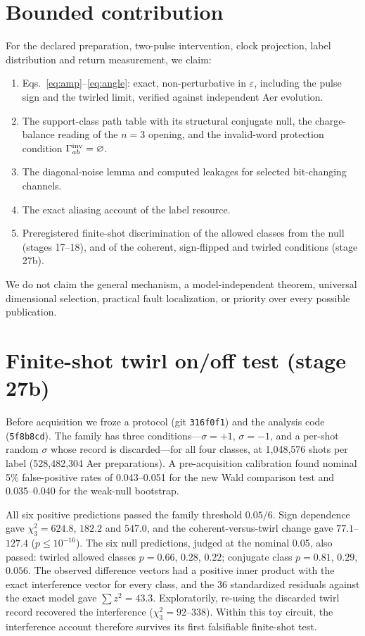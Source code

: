 \documentclass[11pt,a4paper]{article}
\begin{document}
\section*{Bounded contribution}
For the declared preparation, two-pulse intervention, clock projection, label distribution and return measurement, we claim:
\begin{enumerate}\itemsep0pt
\item Eqs.~\eqref{eq:amp}--\eqref{eq:angle}: exact, non-perturbative in $\varepsilon$, including the pulse sign and the twirled limit, verified against independent Aer evolution.
\item The support-class path table with its structural conjugate null, the charge-balance reading of the $n=3$ opening, and the invalid-word protection condition $\Gamma^{\rm inv}_{ab}=\varnothing$.
\item The diagonal-noise lemma and computed leakages for selected bit-changing channels.
\item The exact aliasing account of the label resource.
\item Preregistered finite-shot discrimination of the allowed classes from the null (stages 17--18), and of the coherent, sign-flipped and twirled conditions (stage 27b).
\end{enumerate}
We do not claim the general mechanism, a model-independent theorem, universal dimensional selection, practical fault localization, or priority over every possible publication.

\section*{Finite-shot twirl on/off test (stage 27b)}
Before acquisition we froze a protocol (git \texttt{316f0f1}) and the analysis code (\texttt{5f8b8cd}). The family has three conditions---$\sigma=+1$, $\sigma=-1$, and a per-shot random $\sigma$ whose record is discarded---for all four classes, at 1,048,576 shots per label (528,482,304 Aer preparations). A pre-acquisition calibration found nominal 5\% false-positive rates of 0.043--0.051 for the new Wald comparison test and 0.035--0.040 for the weak-null bootstrap.

All six positive predictions passed the family threshold $0.05/6$. Sign dependence gave $\chi^2_3=624.8$, $182.2$ and $547.0$, and the coherent-versus-twirl change gave $77.1$--$127.4$ ($p\le10^{-16}$). The six null predictions, judged at the nominal 0.05, also passed: twirled allowed classes $p=0.66$, $0.28$, $0.22$; conjugate class $p=0.81$, $0.29$, $0.056$. The observed difference vectors had a positive inner product with the exact interference vector for every class, and the 36 standardized residuals against the exact model gave $\sum z^2=43.3$. Exploratorily, re-using the discarded twirl record recovered the interference ($\chi^2_3=92$--$338$). Within this toy circuit, the interference account therefore survives its first falsifiable finite-shot test.
\end{document}
